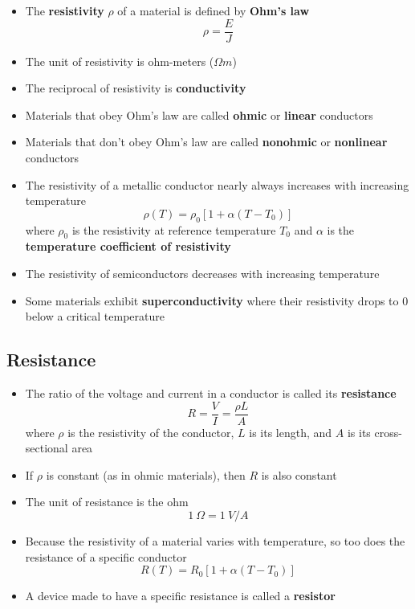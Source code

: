 \documentclass{article}
\begin{document}
\begin{itemize}
  \item The \textbf{resistivity} $\rho$ of a material is defined by \textbf{Ohm's law} \[\rho = \frac{E}{J}\]

  \item The unit of resistivity is ohm-meters ($\unit{\Omega m}$)

  \item The reciprocal of resistivity is \textbf{conductivity}

  \item Materials that obey Ohm's law are called \textbf{ohmic} or \textbf{linear} conductors

  \item Materials that don't obey Ohm's law are called \textbf{nonohmic} or \textbf{nonlinear} conductors

  \item The resistivity of a metallic conductor nearly always increases with increasing temperature \[\rho(T) = \rho_0 [1 + \alpha (T - T_0)]\] where $\rho_0$ is the resistivity at reference temperature $T_0$ and $\alpha$ is the \textbf{temperature coefficient of resistivity}

  \item The resistivity of semiconductors decreases with increasing temperature

  \item Some materials exhibit \textbf{superconductivity} where their resistivity drops to 0 below a critical temperature
\end{itemize}

\subsection{Resistance}

\begin{itemize}
  \item The ratio of the voltage and current in a conductor is called its \textbf{resistance} \[R = \frac{V}{I} = \frac{\rho L}{A}\] where $\rho$ is the resistivity of the conductor, $L$ is its length, and $A$ is its cross-sectional area

  \item If $\rho$ is constant (as in ohmic materials), then $R$ is also constant

  \item The unit of resistance is the ohm \[\qty{1}{\Omega} = \qty{1}{V/A}\]

  \item Because the resistivity of a material varies with temperature, so too does the resistance of a specific conductor \[R(T) = R_0 [1 + \alpha (T - T_0)]\]

  \item A device made to have a specific resistance is called a \textbf{resistor}
\end{itemize}
\end{document}
